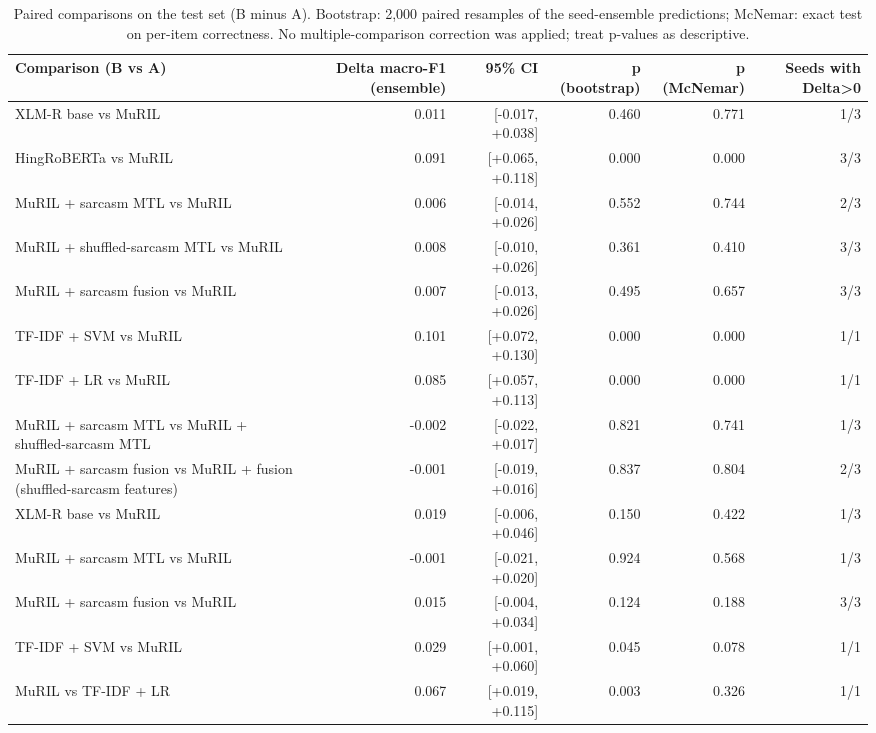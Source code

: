 \begin{table}[t]
\centering
\small
\caption{Paired comparisons on the test set (B minus A). Bootstrap: 2,000 paired resamples of the seed-ensemble predictions; McNemar: exact test on per-item correctness. No multiple-comparison correction was applied; treat p-values as descriptive.}
\label{tab:tab07_paired_tests}
\begin{tabular}{lrrrrr}
\toprule
Comparison (B vs A) & Delta macro-F1 (ensemble) & 95\% CI & p (bootstrap) & p (McNemar) & Seeds with Delta>0 \\
\midrule
XLM-R base vs MuRIL & 0.011 & [-0.017, +0.038] & 0.460 & 0.771 & 1/3 \\
HingRoBERTa vs MuRIL & 0.091 & [+0.065, +0.118] & 0.000 & 0.000 & 3/3 \\
MuRIL + sarcasm MTL vs MuRIL & 0.006 & [-0.014, +0.026] & 0.552 & 0.744 & 2/3 \\
MuRIL + shuffled-sarcasm MTL vs MuRIL & 0.008 & [-0.010, +0.026] & 0.361 & 0.410 & 3/3 \\
MuRIL + sarcasm fusion vs MuRIL & 0.007 & [-0.013, +0.026] & 0.495 & 0.657 & 3/3 \\
TF-IDF + SVM vs MuRIL & 0.101 & [+0.072, +0.130] & 0.000 & 0.000 & 1/1 \\
TF-IDF + LR vs MuRIL & 0.085 & [+0.057, +0.113] & 0.000 & 0.000 & 1/1 \\
MuRIL + sarcasm MTL vs MuRIL + shuffled-sarcasm MTL & -0.002 & [-0.022, +0.017] & 0.821 & 0.741 & 1/3 \\
MuRIL + sarcasm fusion vs MuRIL + fusion (shuffled-sarcasm features) & -0.001 & [-0.019, +0.016] & 0.837 & 0.804 & 2/3 \\
XLM-R base vs MuRIL & 0.019 & [-0.006, +0.046] & 0.150 & 0.422 & 1/3 \\
MuRIL + sarcasm MTL vs MuRIL & -0.001 & [-0.021, +0.020] & 0.924 & 0.568 & 1/3 \\
MuRIL + sarcasm fusion vs MuRIL & 0.015 & [-0.004, +0.034] & 0.124 & 0.188 & 3/3 \\
TF-IDF + SVM vs MuRIL & 0.029 & [+0.001, +0.060] & 0.045 & 0.078 & 1/1 \\
MuRIL vs TF-IDF + LR & 0.067 & [+0.019, +0.115] & 0.003 & 0.326 & 1/1 \\
\bottomrule
\end{tabular}
\end{table}
